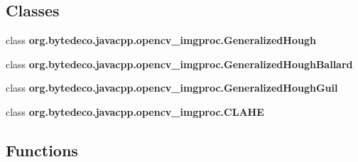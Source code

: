 \subsection*{Classes}
\begin{DoxyCompactItemize}
\item 
class {\bfseries org.\+bytedeco.\+javacpp.\+opencv\+\_\+imgproc.\+Generalized\+Hough}
\item 
class {\bfseries org.\+bytedeco.\+javacpp.\+opencv\+\_\+imgproc.\+Generalized\+Hough\+Ballard}
\item 
class {\bfseries org.\+bytedeco.\+javacpp.\+opencv\+\_\+imgproc.\+Generalized\+Hough\+Guil}
\item 
class {\bfseries org.\+bytedeco.\+javacpp.\+opencv\+\_\+imgproc.\+C\+L\+A\+HE}
\end{DoxyCompactItemize}
\subsection*{Functions}
